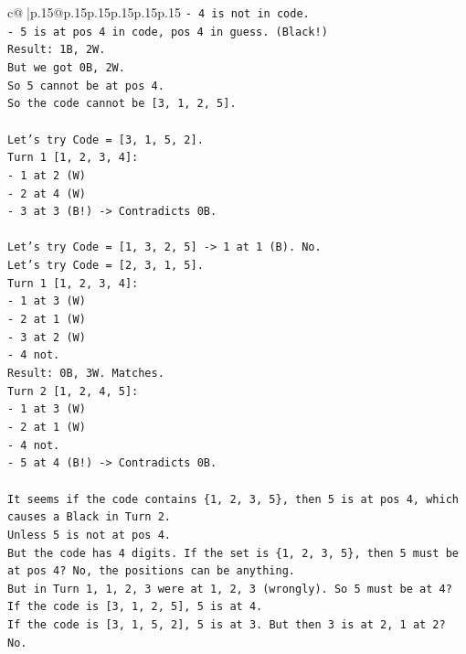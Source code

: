 \documentclass{article}
\begin{document}
{\begin{supertabular}{c@{$\;$}|p{.15\linewidth}@{}p{.15\linewidth}p{.15\linewidth}p{.15\linewidth}p{.15\linewidth}p{.15\linewidth}}
{{{\texttt{{-} 4 is not in code.} \\
\texttt{{-} 5 is at pos 4 in code, pos 4 in guess. (Black!)} \\
\texttt{Result: 1B, 2W.} \\
\texttt{But we got 0B, 2W.} \\
\texttt{So 5 cannot be at pos 4.} \\
\texttt{So the code cannot be {[}3, 1, 2, 5{]}.} \\
\\ 
\texttt{Let's try Code = {[}3, 1, 5, 2{]}.} \\
\texttt{Turn 1 {[}1, 2, 3, 4{]}:} \\
\texttt{{-} 1 at 2 (W)} \\
\texttt{{-} 2 at 4 (W)} \\
\texttt{{-} 3 at 3 (B!) {-}> Contradicts 0B.} \\
\\ 
\texttt{Let's try Code = {[}1, 3, 2, 5{]} {-}> 1 at 1 (B). No.} \\
\texttt{Let's try Code = {[}2, 3, 1, 5{]}.} \\
\texttt{Turn 1 {[}1, 2, 3, 4{]}:} \\
\texttt{{-} 1 at 3 (W)} \\
\texttt{{-} 2 at 1 (W)} \\
\texttt{{-} 3 at 2 (W)} \\
\texttt{{-} 4 not.} \\
\texttt{Result: 0B, 3W. Matches.} \\
\texttt{Turn 2 {[}1, 2, 4, 5{]}:} \\
\texttt{{-} 1 at 3 (W)} \\
\texttt{{-} 2 at 1 (W)} \\
\texttt{{-} 4 not.} \\
\texttt{{-} 5 at 4 (B!) {-}> Contradicts 0B.} \\
\\ 
\texttt{It seems if the code contains \{1, 2, 3, 5\}, then 5 is at pos 4, which causes a Black in Turn 2.} \\
\texttt{Unless 5 is not at pos 4.} \\
\texttt{But the code has 4 digits. If the set is \{1, 2, 3, 5\}, then 5 must be at pos 4? No, the positions can be anything.} \\
\texttt{But in Turn 1, 1, 2, 3 were at 1, 2, 3 (wrongly). So 5 must be at 4?} \\
\texttt{If the code is {[}3, 1, 2, 5{]}, 5 is at 4.} \\
\texttt{If the code is {[}3, 1, 5, 2{]}, 5 is at 3. But then 3 is at 2, 1 at 2? No.} \\
}}}
\end{supertabular}}
\end{document}

